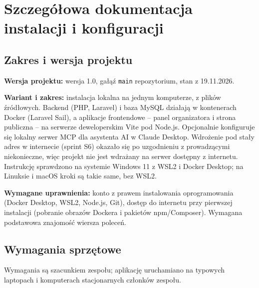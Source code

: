 \documentclass[11pt,a4paper,oneside]{article}
\newif\ifpodpowiedzi
\newcommand{\podpowiedz}[1]{\ifpodpowiedzi\par\begingroup\small\color{hintcolor}\textit{Wskazówka: #1}\par\endgroup\fi}
\begin{document}
\section{Szczegółowa dokumentacja instalacji i konfiguracji}
\subsection{Zakres i wersja projektu}
\podpowiedz{Podaj wersję projektu, której dotyczy instrukcja, oraz opisany wariant wdrożenia, np. lokalny, serwerowy, kontenerowy lub na urządzeniu. Wskaż, czy instrukcja obejmuje uruchomienie gotowego rezultatu, odtworzenie go z plików źródłowych, czy oba warianty. Opisz wymaganą wiedzę i uprawnienia osoby wykonującej czynności.}
\textbf{Wersja projektu:} wersja 1.0, gałąź \texttt{main} repozytorium, stan z 19.11.2026.\par
\textbf{Wariant i zakres:} instalacja lokalna na jednym komputerze, z plików źródłowych. Backend (PHP, Laravel) i baza MySQL działają w kontenerach Docker (Laravel Sail), a aplikacje frontendowe -- panel organizatora i strona publiczna -- na serwerze deweloperskim Vite pod Node.js. Opcjonalnie konfiguruje się lokalny serwer MCP dla asystenta AI w Claude Desktop. Wdrożenie pod stały adres w internecie (sprint S6) okazało się po uzgodnieniu z prowadzącymi niekonieczne, więc projekt nie jest wdrażany na serwer dostępny z internetu. Instrukcję sprawdzono na systemie Windows 11 z WSL2 i Docker Desktop; na Linuksie i macOS kroki są takie same, bez WSL2.\par
\textbf{Wymagane uprawnienia:} konto z prawem instalowania oprogramowania (Docker Desktop, WSL2, Node.js, Git), dostęp do internetu przy pierwszej instalacji (pobranie obrazów Dockera i pakietów npm/Composer). Wymagana podstawowa znajomość wiersza poleceń.

\newpage
\subsection{Wymagania sprzętowe}
\podpowiedz{Podaj minimalne zasoby potrzebne do działania projektu: procesor, pamięć RAM, miejsce na dysku, GPU, urządzenia i połączenia sieciowe, o ile mają znaczenie. Rozróżnij wymagania do uruchomienia oraz budowania, renderowania lub innych prac, jeśli są różne. Wskazuj wymagania sprawdzone albo wyraźnie oznacz szacunki.}
Wymagania są szacunkiem zespołu; aplikację uruchamiano na typowych laptopach i komputerach stacjonarnych członków zespołu.
\end{document}
